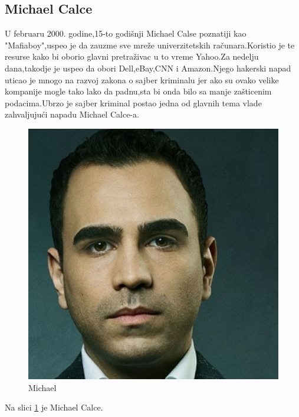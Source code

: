 \documentclass[a4paper]{article}
\begin{document}
\subsection{Michael Calce}
U februaru 2000. godine,15-to godišnji Michael Calse poznatiji kao "Mafiaboy",uspeo je da zauzme sve mreže univerzitetskih računara.Koristio je te resurse kako bi oborio glavni pretraživac u to vreme Yahoo.Za nedelju dana,takodje je uspeo da obori Dell,eBay,CNN i Amazon.Njego hakerski napad uticao je mnogo na razvoj zakona o sajber kriminalu jer ako su ovako velike kompanije mogle tako lako da padnu,sta bi onda bilo sa manje zašticenim podacima.Ubrzo je sajber kriminal postao jedna od glavnih tema vlade zahvaljujući napadu Michael Calce-a.
\begin{figure}[h!]
	\begin{center}
		\includegraphics[scale=0.10]{michael.jpg}
	\end{center}
	\caption{Michael}
	\label{fig:michael}
\end{figure}

Na slici \ref{fig:michael} je Michael Calce.
\end{document}
